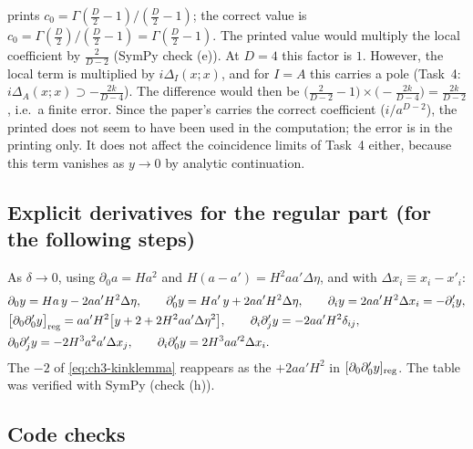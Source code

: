 \begin{discbox}
\PI{} prints $c_0=\Gamma(\tfrac D2-1)/(\tfrac D2-1)$; the correct value is $c_0=\Gamma(\tfrac D2)/(\tfrac D2-1)=\Gamma(\tfrac D2-1)$.
The printed value would multiply the local coefficient by $\tfrac{2}{D-2}$ (SymPy check (e)). At $D=4$ this factor is $1$. However, the local term is multiplied by
$i\Delta_I(x;x)$, and for $I=A$ this carries a pole (Task~4: $i\Delta_A(x;x)\supset-\tfrac{2k}{D-4}$). The difference would then be
$\big(\tfrac{2}{D-2}-1\big)\times\big(-\tfrac{2k}{D-4}\big)=\tfrac{2k}{D-2}$, i.e.\ a finite error.
Since the paper's  carries the correct coefficient ($i/a^{D-2}$), the printed  does not seem to have been used in the computation; the error is in the printing only.
It does not affect the coincidence limits of Task~4 either, because this term vanishes as $y\to0$ by analytic continuation.
\end{discbox}

\subsection{Explicit derivatives for the regular part (for the following steps) \tD}

As $\delta\to0$, using $\partial_0a=Ha^2$ and $H(a-a')=H^2aa'\Delta\eta$, and with $\Delta x_i\equiv x_i-x'_i$:
\begin{equation}
\begin{aligned}
&\partial_0y=Ha\,y-2aa'H^2\Delta\eta, \qquad \partial'_0y=Ha'\,y+2aa'H^2\Delta\eta, \qquad \partial_iy=2aa'H^2\Delta x_i=-\partial'_iy,\\
&\big[\partial_0\partial'_0y\big]_{\rm reg}=aa'H^2\big[y+2+2H^2aa'\Delta\eta^2\big], \qquad \partial_i\partial'_jy=-2aa'H^2\delta_{ij},\\
&\partial_0\partial'_jy=-2H^3a^2a'\Delta x_j, \qquad \partial_i\partial'_0y=2H^3aa'^2\Delta x_i.
\end{aligned}
\label{eq:ch3-yder}
\end{equation}
The $-2$ of \eqref{eq:ch3-kinklemma} reappears as the $+2aa'H^2$ in $[\partial_0\partial'_0y]_{\rm reg}$. The table was verified with SymPy (check (h)).

\subsection{Code checks \tC}
\label{sec:ch3-t8-code}

